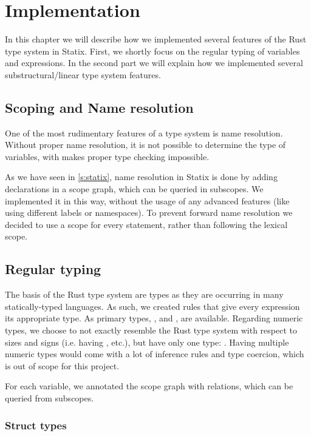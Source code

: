 \section{Implementation} \label{s:implementation}

In this chapter we will describe how we implemented several features of the Rust type system in Statix. First, we shortly focus on the regular typing of variables and expressions. In the second part we will explain how we implemented several substructural/linear type system features.

\subsection{Scoping and Name resolution}

One of the most rudimentary features of a type system is name resolution. Without proper name resolution, it is not possible to determine the type of variables, with makes proper type checking impossible.

As we have seen in \autoref{s:statix}, name resolution in Statix is done by adding declarations in a scope graph, which can be queried in subscopes. We implemented it in this way, without the usage of any advanced features (like using different labels or namespaces). 
To prevent forward name resolution we decided to use a scope for every statement, rather than following the lexical scope.

\subsection{Regular typing} \label{sec:regular-typing}

The basis of the Rust type system are types as they are occurring in many statically-typed languages. As such, we created rules  that give every expression its appropriate type. As primary types, ,  and , are available. Regarding numeric types, we choose to not exactly resemble the Rust type system with respect to sizes and signs (i.e. having ,  etc.), but have only one type: . Having multiple numeric types would come with a lot of inference rules and type coercion, which is out of scope for this project.

For each variable, we annotated the scope graph with  relations, which can be queried from subscopes.

\subsubsection{Struct types} \label{sec:struct-type}


